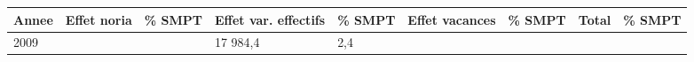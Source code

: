 \begin{longtable}[]{@{}lllllllll@{}}
\toprule
\begin{minipage}[b]{0.05\columnwidth}\raggedright
Annee\strut
\end{minipage} & \begin{minipage}[b]{0.10\columnwidth}\raggedright
Effet noria\strut
\end{minipage} & \begin{minipage}[b]{0.06\columnwidth}\raggedright
\% SMPT\strut
\end{minipage} & \begin{minipage}[b]{0.17\columnwidth}\raggedright
Effet var. effectifs\strut
\end{minipage} & \begin{minipage}[b]{0.06\columnwidth}\raggedright
\% SMPT\strut
\end{minipage} & \begin{minipage}[b]{0.13\columnwidth}\raggedright
Effet vacances\strut
\end{minipage} & \begin{minipage}[b]{0.06\columnwidth}\raggedright
\% SMPT\strut
\end{minipage} & \begin{minipage}[b]{0.05\columnwidth}\raggedright
Total\strut
\end{minipage} & \begin{minipage}[b]{0.06\columnwidth}\raggedright
\% SMPT\strut
\end{minipage}\tabularnewline
\midrule
\endhead
\begin{minipage}[t]{0.05\columnwidth}\raggedright
2009\strut
\end{minipage} & \begin{minipage}[t]{0.10\columnwidth}\raggedright
\strut
\end{minipage} & \begin{minipage}[t]{0.06\columnwidth}\raggedright
\strut
\end{minipage} & \begin{minipage}[t]{0.17\columnwidth}\raggedright
17 984,4\strut
\end{minipage} & \begin{minipage}[t]{0.06\columnwidth}\raggedright
2,4\strut
\end{minipage} & \begin{minipage}[t]{0.13\columnwidth}\raggedright
\strut
\end{minipage} & \begin{minipage}[t]{0.06\columnwidth}\raggedright

\end{minipage}
\end{longtable}
